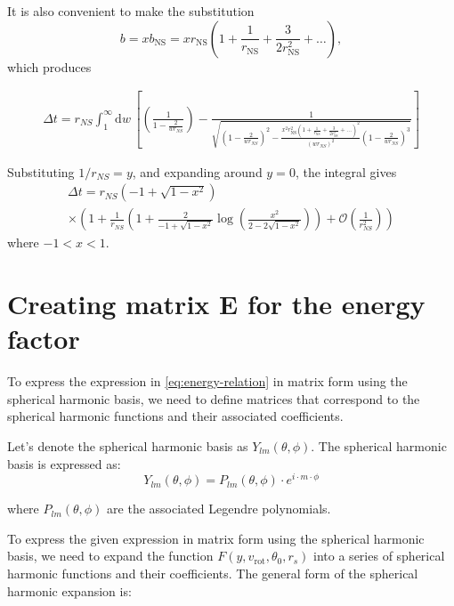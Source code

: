 \documentclass[modern]{aastex631}
\newcommand{\bNS}{b_\mathrm{NS}}
\newcommand{\rNS}{r_\mathrm{NS}}
\begin{document}
%
It is also convenient to make the substitution 
\begin{equation}
    b = x \bNS = x \rNS \left( 1 + \frac{1}{\rNS} + \frac{3}{2 \rNS^2} + \ldots \right),
\end{equation}
which produces 
%
\begin{linenomath}\begin{align}
    \label{eq:tdelay-with-x}
    \Delta t = r_{NS} \int_{1}^{\infty} \mathrm{d}w \, \left[\left(\frac{1}{1-\frac{2}{wr_{NS}}}\right) - \frac{1}{\sqrt{\left(1-\frac{2}{wr_{NS}}\right)^2 - \frac{x^2 \rNS^2 \left( 1 + \frac{1}{\rNS} + \frac{3}{2 \rNS^2} + \ldots \right)^2}{(wr_{NS})^2}\left(1-\frac{2}{wr_{NS}}\right)^3}}\right]
\end{align}\end{linenomath}
%
Substituting $1/r_{NS} = y$, and expanding around $y=0$, the integral gives
%
\begin{multline}
    \label{eq:tdelay-solved}
    \Delta t = r_{NS} \left( -1 + \sqrt{1 - x^2} \right) \\ \times \left( 1 + \frac{1}{r_{NS}} \left( 1  + \frac{2}{-1 + \sqrt{1 - x^2}} \log\left( \frac{x^2}{2 - 2 \sqrt{1 - x^2}} \right) \right) + \mathcal{O}\left( \frac{1}{r_{NS}^2} \right) \right)
\end{multline}
where $-1<x<1$.

\section{Creating matrix E for the energy factor}
To express the expression in \ref{eq:energy-relation} in matrix form using the spherical harmonic basis, we need to define matrices 
that correspond to the spherical harmonic functions and their associated coefficients. 

Let's denote the spherical harmonic basis as $Y_{lm}(\theta, \phi)$. The spherical harmonic basis is expressed as:
\begin{equation}
    \label{eq:spherical-harmonics}
    Y_{lm}(\theta, \phi) = P_{lm}(\theta, \phi) \cdot e^{i \cdot m \cdot \phi}
\end{equation}

where $P_{lm}(\theta, \phi)$ are the associated Legendre polynomials.

To express the given expression in matrix form using the spherical harmonic basis, we need to expand the function \( F(y, v_{\text{rot}}, \theta_0, r_s) \) 
into a series of spherical harmonic functions and their coefficients. The general form of the spherical harmonic expansion is:
\end{document}
